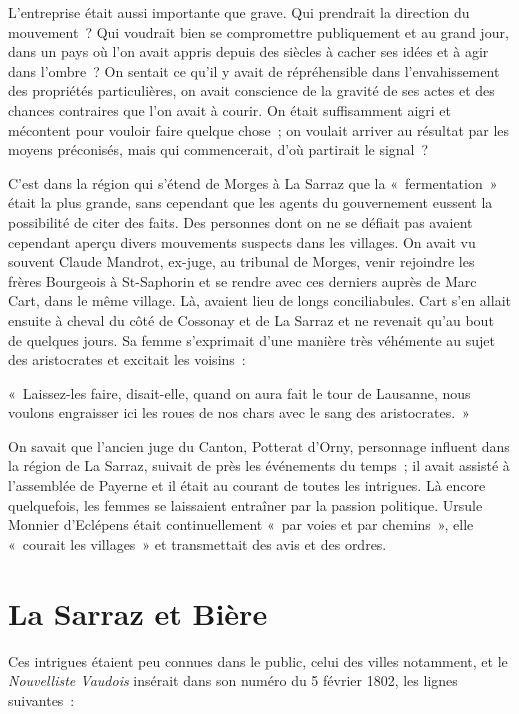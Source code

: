 \documentclass[french,twoside]{book} %
\newenvironment{quoteblock}%
  {\begin{quoting}}
  {\end{quoting}}
\newenvironment{quotebar}{%
    \def\FrameCommand{{\color{rubric!10!}\vrule width 0.5em} \hspace{0.9em}}%
    \def\OuterFrameSep{\itemsep} %
    \MakeFramed {\advance\hsize-\width \FrameRestore}
  }%
  {%
    \endMakeFramed
  }
\renewenvironment{quoteblock}%
  {%
    \savenotes
    \setstretch{0.9}
    \normalfont
    \begin{quotebar}
  }
  {%
    \end{quotebar}
    \spewnotes
  }
\begin{document}
L’entreprise était aussi importante que grave. Qui prendrait la direction du mouvement ? Qui voudrait bien se compromettre publiquement et au grand jour, dans un pays où l’on avait appris depuis des siècles à cacher ses idées et à agir dans l’ombre ? On sentait ce qu’il y avait de répréhensible dans l’envahissement des propriétés particulières, on avait conscience de la gravité de ses actes et des chances contraires que l’on avait à courir. On était suffisamment aigri et mécontent pour vouloir faire quelque chose ; on voulait arriver au résultat par les moyens préconisés, mais qui commencerait, d’où partirait le signal ?\par
C’est dans la région qui s’étend de Morges à La Sarraz que la « fermentation » était la plus grande, sans cependant que les agents du gouvernement eussent la possibilité de citer des faits. Des personnes dont on ne se défiait pas avaient cependant aperçu divers mouvements suspects dans les villages. On avait vu souvent Claude Mandrot, ex-juge, au tribunal de Morges, venir rejoindre les frères Bourgeois à St-Saphorin et se rendre avec ces derniers auprès de Marc Cart, dans le même village. Là, avaient lieu de longs conciliabules. Cart s’en allait ensuite à cheval du côté de Cossonay et de La Sarraz et ne revenait qu’au bout de quelques jours. Sa femme s’exprimait d’une manière très véhémente au sujet des aristocrates et excitait les voisins :\par

\begin{quoteblock}
\noindent « Laissez-les faire, disait-elle, quand on aura fait le tour de Lausanne, nous voulons engraisser ici les roues de nos chars avec le sang des aristocrates. »\end{quoteblock}

\noindent On savait que l’ancien juge du Canton, Potterat d’Orny, personnage influent dans la région de La Sarraz, suivait de près les événements du temps ; il avait assisté à l’assemblée de Payerne et il était au courant de toutes les intrigues. Là encore quelquefois, les femmes se laissaient entraîner par la passion politique. Ursule Monnier d’Eclépens était continuellement « par voies et par chemins », elle « courait les villages » et transmettait des avis et des ordres.
\section[La Sarraz et Bière]{La Sarraz et Bière}
\noindent Ces intrigues étaient peu connues dans le public, celui des villes notamment, et le \emph{Nouvelliste Vaudois} insérait dans son numéro du 5 février 1802, les lignes suivantes :\par
\end{document}
